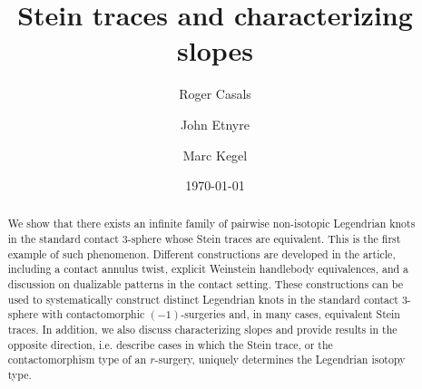 \documentclass[11pt]{amsart} %
\theoremstyle{plain}
\theoremstyle{definition}
\begin{document}

\title[Stein traces and characterizing slopes]{Stein traces and characterizing slopes}

\author{Roger Casals}
\address{University of California Davis, Dept. of Mathematics, Shields Avenue, Davis, CA 95616, USA}


\author{John Etnyre}
\address{School of Mathematics, Georgia Institute
	of Technology,  Atlanta, GA}


\author{Marc Kegel}
\address{Humboldt-Universit\"at zu Berlin, Rudower Chaussee 25, 12489 Berlin, Germany.}



\date{\today}





\begin{abstract}
We show that there exists an infinite family of pairwise non-isotopic Legendrian knots in the standard contact $3$-sphere whose Stein traces are equivalent. This is the first example of such phenomenon. Different constructions are developed in the article, including a contact annulus twist, explicit Weinstein handlebody equivalences, and a discussion on dualizable patterns in the contact setting. These constructions can be used to systematically construct distinct Legendrian knots in the standard contact $3$-sphere with contactomorphic $(-1)$-surgeries and, in many cases, equivalent Stein traces. In addition, we also discuss characterizing slopes and provide results in the opposite direction, i.e. describe cases in which the Stein trace, or the contactomorphism type of an $r$-surgery, uniquely determines the Legendrian isotopy type.
\end{abstract}


\makeatletter
{}
\makeatother%

\makeatletter
\def\blfootnote{\xdef\@thefnmark{}\@footnotetext}
\makeatother



\end{document}
